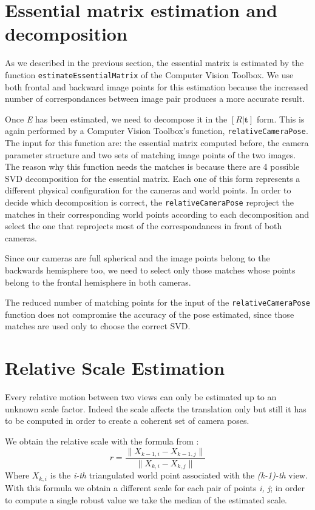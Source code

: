 \section{Essential matrix estimation and decomposition}
As we described in the previous section, the essential matrix is estimated 
by the function {\tt estimateEssentialMatrix} of the Computer Vision Toolbox.
We use both frontal and backward image points for this estimation because
the increased number of correspondances between image pair produces 
a more accurate result.

Once \textit{E} has been estimated, we need to decompose it in the 
\( [R|\mathbf{t} ] \) form. This is again performed by a Computer Vision 
Toolbox's function, {\tt relativeCameraPose}.
The input for this function are: the essential matrix computed before, the 
camera parameter structure and two sets of matching image points of the two 
images.
The reason why this function needs the matches is because there are 4 possible 
SVD decomposition for the essential matrix. Each one of this form represents a 
different physical configuration for the cameras and world points.
In order to decide which decomposition is correct, the {\tt relativeCameraPose}
reproject the matches in their corresponding world points according to each 
decomposition and select the one that reprojects most of the correspondances in 
front of both cameras.

Since our cameras are full spherical and the image points belong to the 
backwards hemisphere too, we need to select only those matches whose points 
belong to the frontal hemisphere in both cameras.

The reduced number of matching points for the input of the 
{\tt relativeCameraPose} function does not compromise the accuracy of the pose 
estimated, since those matches are used only to choose the 
correct SVD.

\section{Relative Scale Estimation}
Every relative motion between two views can only be estimated up to an unknown 
scale factor. Indeed the scale affects the translation only but still it has to 
be computed in order to create a coherent set of camera poses.

We obtain the relative scale with the formula from 
\cite{scaramuzzaVisualOdometryI}:
\begin{equation}
	r = \frac{\| X_{k-1, i} - X_{k - 1, j} \|}{\| X_{k, i} - X_{k, j} \|}
\end{equation}
Where \( X_{k, i} \) is the \textit{i-th} triangulated world point associated 
with the \textit{(k-1)-th} view. With this formula we obtain a different scale 
for each pair of points \textit{i, j}; in order to compute a single robust value
we take the median of the estimated scale.

